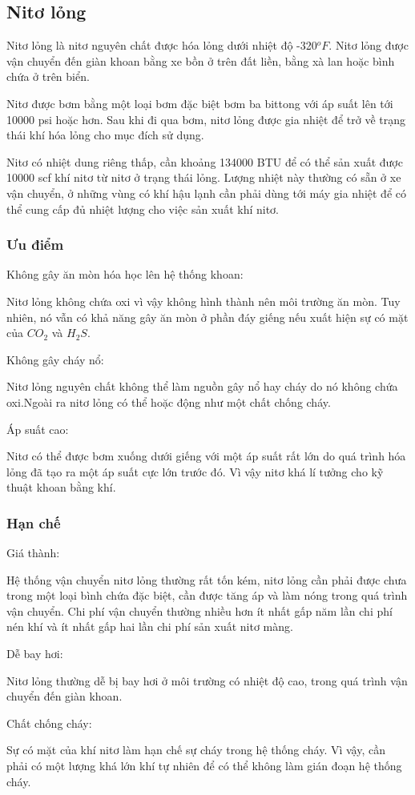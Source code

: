 \documentclass[13pt,a4paper]{article}
\begin{document}
\subsection{Nitơ lỏng}
	Nitơ lỏng là nitơ nguyên chất được hóa lỏng dưới nhiệt độ -320$^oF$. Nitơ lỏng được vận chuyển đến giàn khoan bằng xe bồn ở trên đất liền, bằng xà lan hoặc bình chứa ở trên biển.\par
	Nitơ được bơm bằng một loại bơm đặc biệt bơm ba bittong với áp suất lên tới 10000 psi hoặc hơn. Sau khi đi qua bơm, nitơ lỏng được gia nhiệt để trở về trạng thái khí hóa lỏng cho mục đích sử dụng.\par
	Nitơ có nhiệt dung riêng thấp, cần khoảng 134000 BTU để có thể sản xuất được 10000 scf khí nitơ từ nitơ ở trạng thái lỏng. Lượng nhiệt này thường có sẵn ở xe vận chuyển, ở những vùng có khí hậu lạnh cần phải dùng tới máy gia nhiệt để có thể cung cấp đủ nhiệt lượng cho việc sản xuất khí nitơ.
	\subsubsection{Ưu điểm}
	Không gây ăn mòn hóa học lên hệ thống khoan: \par
	Nitơ lỏng không chứa oxi vì vậy không hình thành nên môi trường ăn mòn. Tuy nhiên, nó vẫn có khả năng gây ăn mòn ở phần đáy giếng nếu xuất hiện sự có mặt của $CO_2$ và $H_2S$.\par
	Không gây cháy nổ:\par
	Nitơ lỏng nguyên chất không thể làm nguồn gây nổ hay cháy do nó không chứa oxi.Ngoài ra nitơ lỏng có thể hoặc động như một chất chống cháy.\par
	Áp suất cao:\par
	Nitơ có thể được bơm xuống dưới giếng với một áp suất rất lớn do quá trình hóa lỏng đã tạo ra một áp suất cực lớn trước đó. Vì vậy nitơ khá lí tưởng cho kỹ thuật khoan bằng khí.
	\subsubsection{Hạn chế}
	Giá thành:\par
	Hệ thống vận chuyển nitơ lỏng thường rất tốn kém, nitơ lỏng cần phải được chưa trong một loại bình chứa đặc biệt, cần được tăng áp và làm nóng trong quá trình vận chuyển. Chi phí vận chuyển thường nhiều hơn ít nhất gấp năm lần chi phí nén khí và ít nhất gấp hai lần chi phí sản xuất nitơ màng.\par
	Dễ bay hơi:\par
	Nitơ lỏng thường dễ bị bay hơi ở môi trường có nhiệt độ cao, trong quá trình vận chuyển đến giàn khoan.\par
	Chất chống cháy:\par
	Sự có mặt của khí nitơ làm hạn chế sự cháy trong hệ thống cháy. Vì vậy, cần phải có một lượng khá lớn khí tự nhiên để có thể không làm gián đoạn hệ thống cháy.
\end{document}
